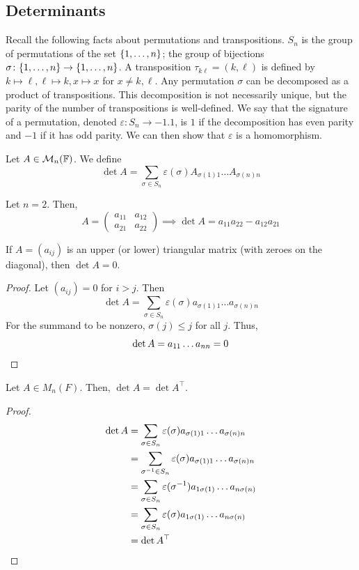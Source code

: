 \documentclass[a4paper]{article}
\begin{document}
\subsection{Determinants}
Recall the following facts about permutations and transpositions.
$ S_n $ is the group of permutations of the set $ \qty{1, \dots, n} $; the group of bijections $ \sigma \colon \qty{1, \dots, n} \to \qty{1, \dots, n} $.
A transposition $ \tau_{k \ell} = (k, \ell) $ is defined by $ k \mapsto \ell, \ell \mapsto k, x \mapsto x $ for $ x \neq k, \ell $.
Any permutation $ \sigma $ can be decomposed as a product of transpositions.
This decomposition is not necessarily unique, but the parity of the number of transpositions is well-defined.
We say that the signature of a permutation, denoted $ \varepsilon \colon S_n \to \qty{-1, 1} $, is $ 1 $ if the decomposition has even parity and $ -1 $ if it has odd parity.
We can then show that $ \varepsilon $ is a homomorphism.

\begin{definition}
	Let $ A \in {\mathcal{M}}_n({\mathbb{F}}) $.
	We define
	\[
		\det A = \sum_{\sigma \in S_n} \varepsilon(\sigma) A_{\sigma(1) 1} \dots A_{\sigma(n) n}
	\]
\end{definition}

\begin{example}
	Let $ n = 2 $.
	Then,
	\[
		A = \begin{pmatrix} a_{11} & a_{12} \\ a_{21} & a_{22} \end{pmatrix} \implies \det A = a_{11} a_{22} - a_{12} a_{21}
	\]
\end{example}
\begin{lemma}
	If $ A = (a_{ij}) $ is an upper (or lower) triangular matrix (with zeroes on the diagonal), then $ \det A = 0 $.
\end{lemma}
\begin{proof}
	Let $ (a_{ij}) = 0 $ for $ i > j $.
	Then
	\[
		\det A = \sum_{\sigma \in S_n} \varepsilon(\sigma) a_{\sigma(1) 1} \dots a_{\sigma(n) n}
	\]
	For the summand to be nonzero, $ \sigma(j) \leq j $ for all $ j $.
	Thus,
	\[
		\det A = a_{1 1} \dots a_{n n} = 0\qedhere
	\]
\end{proof}

\begin{lemma}
	Let $ A \in M_n(F) $.
	Then, $ \det A = \det A^\top $.
\end{lemma}
\begin{proof}
	\begin{align*}
		\det A & = \sum_{\sigma \in S_n} \varepsilon(\sigma) a_{\sigma(1) 1} \dots a_{\sigma(n) n}      \\
		       & = \sum_{\sigma^{-1} \in S_n} \varepsilon(\sigma) a_{\sigma(1) 1} \dots a_{\sigma(n) n} \\
		       & = \sum_{\sigma \in S_n} \varepsilon(\sigma^{-1}) a_{1 \sigma(1)} \dots a_{n \sigma(n)} \\
		       & = \sum_{\sigma \in S_n} \varepsilon(\sigma) a_{1 \sigma(1)} \dots a_{n \sigma(n)}      \\
		       & = \det A^\top\qedhere
	\end{align*}
\end{proof}
\end{document}
